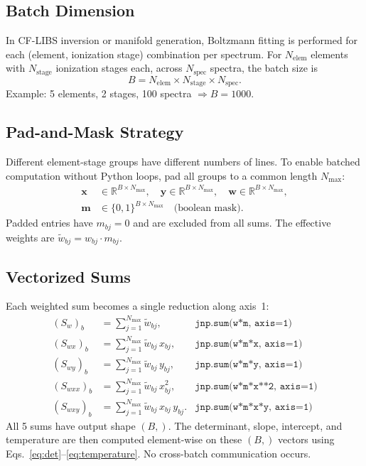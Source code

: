 \documentclass[11pt]{article}
\begin{document}
\subsection{Batch Dimension}

In CF-LIBS inversion or manifold generation, Boltzmann fitting is performed for
each (element, ionization stage) combination per spectrum. For $N_{\text{elem}}$
elements with $N_{\text{stage}}$ ionization stages each, across $N_{\text{spec}}$
spectra, the batch size is
\begin{equation}
  B = N_{\text{elem}} \times N_{\text{stage}} \times N_{\text{spec}}.
  \label{eq:batch_size}
\end{equation}
Example: 5 elements, 2 stages, 100 spectra $\Rightarrow B = 1000$.

\subsection{Pad-and-Mask Strategy}

Different element-stage groups have different numbers of lines. To enable
batched computation without Python loops, pad all groups to a common length
$N_{\max}$:
\begin{align}
  \mathbf{x}    &\in \mathbb{R}^{B \times N_{\max}}, \quad
  \mathbf{y}    \in \mathbb{R}^{B \times N_{\max}}, \quad
  \mathbf{w}    \in \mathbb{R}^{B \times N_{\max}}, \label{eq:pad_arrays} \\
  \mathbf{m}    &\in \{0, 1\}^{B \times N_{\max}} \quad \text{(boolean mask)}.
  \label{eq:mask_array}
\end{align}
Padded entries have $m_{bj} = 0$ and are excluded from all sums. The effective
weights are $\tilde{w}_{bj} = w_{bj} \cdot m_{bj}$.

\subsection{Vectorized Sums}

Each weighted sum becomes a single reduction along axis~1:
\begin{align}
  (S_w)_b       &= \sum_{j=1}^{N_{\max}} \tilde{w}_{bj},          & \texttt{jnp.sum(w*m, axis=1)} \label{eq:Sw_batch} \\
  (S_{wx})_b    &= \sum_{j=1}^{N_{\max}} \tilde{w}_{bj}\,x_{bj},  & \texttt{jnp.sum(w*m*x, axis=1)} \\
  (S_{wy})_b    &= \sum_{j=1}^{N_{\max}} \tilde{w}_{bj}\,y_{bj},  & \texttt{jnp.sum(w*m*y, axis=1)} \\
  (S_{wxx})_b   &= \sum_{j=1}^{N_{\max}} \tilde{w}_{bj}\,x_{bj}^2,& \texttt{jnp.sum(w*m*x**2, axis=1)} \\
  (S_{wxy})_b   &= \sum_{j=1}^{N_{\max}} \tilde{w}_{bj}\,x_{bj}\,y_{bj}. & \texttt{jnp.sum(w*m*x*y, axis=1)} \label{eq:Swxy_batch}
\end{align}
All 5 sums have output shape $(B,)$. The determinant, slope, intercept,
and temperature are then computed element-wise on these $(B,)$ vectors
using Eqs.~\eqref{eq:det}--\eqref{eq:temperature}. No cross-batch communication occurs.
\end{document}
